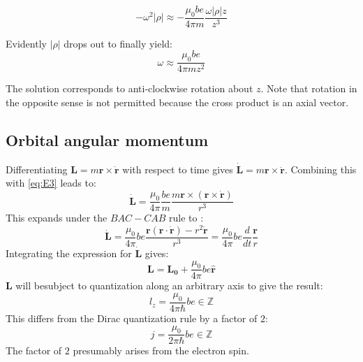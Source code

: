 \documentclass[twocolumn]{article}
\begin{document}
\begin{equation}
\label{eq:E5}
-\omega^2|\rho| \approx - \frac {\mu_0 be}{4 \pi m}\frac {\omega |\rho|z}{z^3}
\end{equation}

\noindent
Evidently $|\rho|$ drops out  to finally yield:
\begin{equation}
\label{eq:E6}
\omega \approx \frac {\mu_0 be}{4 \pi m z^2}
\end{equation}

\noindent
The solution corresponds to anti-clockwise rotation about $z$. Note that rotation in the opposite sense is not permitted because the cross product is an axial vector.

\subsection{Orbital angular momentum}
Differentiating $\mathbf{L} = m \mathbf{{r}} \times \mathbf{\dot r}$ with respect to time gives $\mathbf{\dot L} = m \mathbf r \times \mathbf {\ddot r}$. Combining this with \eqref{eq:E3} leads to:
\begin{equation}
\label{eq:E7}
\mathbf {\dot{L}}
= \frac {\mu_0 }{4 \pi } \frac {be}{m}
\frac {m \mathbf r \times ( \mathbf r \times \mathbf {\dot r})  } {r^3}
\end{equation}
This expands under the $BAC-CAB$ rule to :
\begin{equation}
\label{eq:E8}
\mathbf {\dot{L}}
= \frac {\mu_0 }{4 \pi }  {be}
\frac {\mathbf r  ( \mathbf r \cdot \mathbf {\dot r} )  - r^2 \mathbf {\dot r}   } {r^3}
= \frac {\mu_0 }{4 \pi }  {be} \frac {d} {dt} \frac {\mathbf r} {r}
\end{equation}
Integrating the expression for $\mathbf {\dot{L}}$ gives:
\begin{equation}
\label{eq:E9}
\mathbf {L} = \mathbf {L_0} + \frac {\mu_0 }{4 \pi } be  \mathbf {\hat r}
\end{equation}
$\mathbf {L}$ will besubject to quantization along  an arbitrary axis to give the result:
\begin{equation}
\label{eq:E10}
l_z = \frac {\mu_0 }{4 \pi \hbar }  {be} \in  \mathbb Z
\end{equation}
This differs from the Dirac quantization rule by a factor of $2$:
\begin{equation}
\label{eq:E11}
j = \frac {\mu_0 }{2 \pi  \hbar} {be} \in  \mathbb Z
\end{equation}
\noindent
The factor of $2$ presumably arises from the electron spin.
\end{document}
